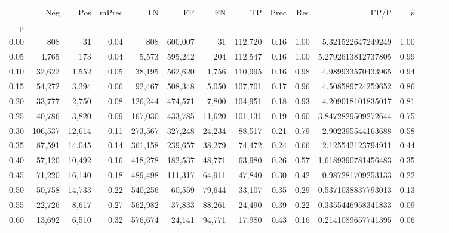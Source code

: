 \begin{tabular}{rrrrrrrrrrrrrrr}
\toprule
{} &      Neg &     Pos & mPrec &       TN &       FP &       FN &       TP &  Prec &   Rec &                    FP/P & $\hat{p}$ \\
p    &          &         &       &          &          &          &          &       &       &                         &           \\
\midrule
0.00 &      808 &      31 &  0.04 &      808 &  600,007 &       31 &  112,720 &  0.16 &  1.00 &       5.321522647249249 &      1.00 \\
0.05 &    4,765 &     173 &  0.04 &    5,573 &  595,242 &      204 &  112,547 &  0.16 &  1.00 &      5.2792613812737805 &      0.99 \\
0.10 &   32,622 &   1,552 &  0.05 &   38,195 &  562,620 &    1,756 &  110,995 &  0.16 &  0.98 &       4.989933570433965 &      0.94 \\
0.15 &   54,272 &   3,294 &  0.06 &   92,467 &  508,348 &    5,050 &  107,701 &  0.17 &  0.96 &       4.508589724259652 &      0.86 \\
0.20 &   33,777 &   2,750 &  0.08 &  126,244 &  474,571 &    7,800 &  104,951 &  0.18 &  0.93 &       4.209018101835017 &      0.81 \\
0.25 &   40,786 &   3,820 &  0.09 &  167,030 &  433,785 &   11,620 &  101,131 &  0.19 &  0.90 &      3.8472829509272644 &      0.75 \\
0.30 &  106,537 &  12,614 &  0.11 &  273,567 &  327,248 &   24,234 &   88,517 &  0.21 &  0.79 &       2.902395544163688 &      0.58 \\
0.35 &   87,591 &  14,045 &  0.14 &  361,158 &  239,657 &   38,279 &   74,472 &  0.24 &  0.66 &       2.125542123794911 &      0.44 \\
0.40 &   57,120 &  10,492 &  0.16 &  418,278 &  182,537 &   48,771 &   63,980 &  0.26 &  0.57 &      1.6189390781456483 &      0.35 \\
0.45 &   71,220 &  16,140 &  0.18 &  489,498 &  111,317 &   64,911 &   47,840 &  0.30 &  0.42 &       0.987281709253133 &      0.22 \\
0.50 &   50,758 &  14,733 &  0.22 &  540,256 &   60,559 &   79,644 &   33,107 &  0.35 &  0.29 &      0.5371038837793013 &      0.13 \\
0.55 &   22,726 &   8,617 &  0.27 &  562,982 &   37,833 &   88,261 &   24,490 &  0.39 &  0.22 &      0.3355446958341833 &      0.09 \\
0.60 &   13,692 &   6,510 &  0.32 &  576,674 &   24,141 &   94,771 &   17,980 &  0.43 &  0.16 &      0.2141089657741395 &      0.06 \\

\end{tabular}
